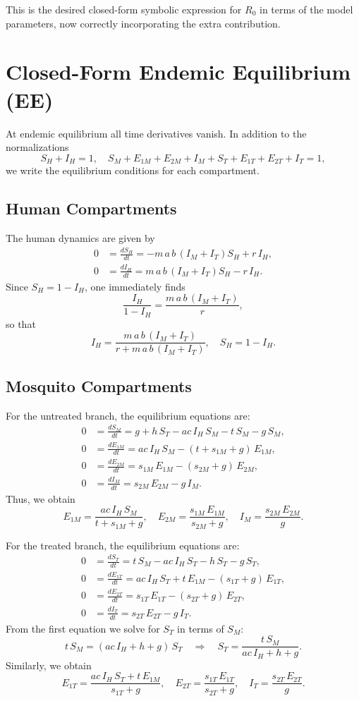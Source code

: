 \documentclass{article}
\begin{document}
This is the desired closed-form symbolic expression for \(R_0\) in terms of the model parameters, now correctly incorporating the extra contribution.

\bigskip

\section{Closed-Form Endemic Equilibrium (EE)}

At endemic equilibrium all time derivatives vanish. In addition to the normalizations
\[
S_H+I_H=1,\quad S_M+E_{1M}+E_{2M}+I_M+S_T+E_{1T}+E_{2T}+I_T=1,
\]
we write the equilibrium conditions for each compartment.

\subsection{Human Compartments}

The human dynamics are given by
\[
\begin{aligned}
0 &= \frac{dS_H}{dt} = -m\,a\,b\,(I_M+I_T)S_H + r\,I_H,\\[1mm]
0 &= \frac{dI_H}{dt} = m\,a\,b\,(I_M+I_T)S_H - r\,I_H.
\end{aligned}
\]
Since \(S_H=1-I_H\), one immediately finds
\[
\frac{I_H}{1-I_H}=\frac{m\,a\,b\,(I_M+I_T)}{r},
\]
so that
\[
\boxed{
I_H=\frac{m\,a\,b\,(I_M+I_T)}{r+m\,a\,b\,(I_M+I_T)},\quad S_H=1-I_H.
}
\]

\subsection{Mosquito Compartments}

For the untreated branch, the equilibrium equations are:
\[
\begin{aligned}
0 &= \frac{dS_M}{dt}=g+h\,S_T - ac\,I_H\,S_M -t\,S_M -g\,S_M,\\[1mm]
0 &= \frac{dE_{1M}}{dt}=ac\,I_H\,S_M -(t+s_{1M}+g)\,E_{1M},\\[1mm]
0 &= \frac{dE_{2M}}{dt}=s_{1M}\,E_{1M} -(s_{2M}+g)\,E_{2M},\\[1mm]
0 &= \frac{dI_M}{dt}=s_{2M}\,E_{2M}-g\,I_M.
\end{aligned}
\]
Thus, we obtain
\[
\boxed{
E_{1M}=\frac{ac\,I_H\,S_M}{t+s_{1M}+g},\quad
E_{2M}=\frac{s_{1M}\,E_{1M}}{s_{2M}+g},\quad
I_M=\frac{s_{2M}\,E_{2M}}{g}.
}
\]

For the treated branch, the equilibrium equations are:
\[
\begin{aligned}
0 &= \frac{dS_T}{dt}=t\,S_M-ac\,I_H\,S_T-h\,S_T-g\,S_T,\\[1mm]
0 &= \frac{dE_{1T}}{dt}=ac\,I_H\,S_T+t\,E_{1M}-(s_{1T}+g)\,E_{1T},\\[1mm]
0 &= \frac{dE_{2T}}{dt}=s_{1T}\,E_{1T}-(s_{2T}+g)\,E_{2T},\\[1mm]
0 &= \frac{dI_T}{dt}=s_{2T}\,E_{2T}-g\,I_T.
\end{aligned}
\]
From the first equation we solve for \(S_T\) in terms of \(S_M\):
\[
t\,S_M=(ac\,I_H+h+g)\,S_T \quad\Longrightarrow\quad \boxed{S_T=\frac{t\,S_M}{ac\,I_H+h+g}}.
\]
Similarly, we obtain
\[
\boxed{
E_{1T}=\frac{ac\,I_H\,S_T+t\,E_{1M}}{s_{1T}+g},\quad
E_{2T}=\frac{s_{1T}\,E_{1T}}{s_{2T}+g},\quad
I_T=\frac{s_{2T}\,E_{2T}}{g}.
}
\]
\end{document}
